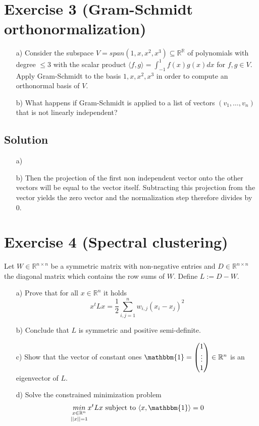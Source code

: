 \documentclass[10pt]{article}
\numberwithin{equation}{section}
\begin{document}
\section*{Exercise 3 (Gram-Schmidt orthonormalization)}
\begin{enumerate}
\item[a)]{
    Consider the subspace $V = span(1, x, x^2 , x^3) \subseteq \mathbb{R}^{\mathbb{R}}$ of polynomials with degree $\leq 3$ with the scalar product $\langle f, g\rangle = \int_{-1}^1 f(x)g(x)dx$ for $f, g \in V$. Apply Gram-Schmidt to the basis $1, x, x^2 , x^3$ in order to compute an orthonormal basis of $V$.
  }
\item[b)]{
    What happens if Gram-Schmidt is applied to a list of vectors $(v_1, \dots, v_n)$ that is not linearly independent?
  }
\end{enumerate}

\subsection*{Solution}
\begin{enumerate}
\item[a)]{
  }
\item[b)]{
    Then the projection of the first non independent vector onto the other vectors will be equal to the vector itself. Subtracting this projection from the vector yields the zero vector and the normalization step therefore divides by 0.
  }
\end{enumerate}

\section*{Exercise 4 (Spectral clustering)}
Let $W \in \mathbb{R}^{n\times n}$ be a symmetric matrix with non-negative entries and $D \in \mathbb{R}^{n\times n}$ the diagonal matrix which contains the row sums of $W$. Define $L := D - W$.


\begin{enumerate}
\item[a)]{
    Prove that for all $x \in \mathbb{R}^n$ it holds
    $$ x^t Lx = \frac{1}{2} \sum_{i,j=1}^n w_{i,j} (x_i - x_j)^2$$
  }
\item[b)]{
    Conclude that $L$ is symmetric and positive semi-definite.
  }
\item[c)]{
    Show that the vector of constant ones $\mathbbm{1} = \begin{pmatrix} 1 \\ \vdots \\ 1\end{pmatrix} \in \mathbb{R}^n$ is an eigenvector of $L$.
  }
\item[d)]{
  Solve the constrained minimization problem
  $$\underset{||x|| = 1}{\underset{x\in \mathbb{R}^n}{min}} x^t Lx \text{ subject to }\langle x, \mathbbm{1} \rangle = 0$$
}
\end{enumerate}
\end{document}
